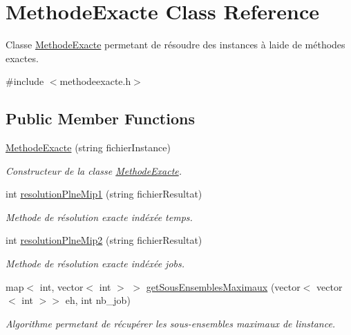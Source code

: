 \hypertarget{classMethodeExacte}{}\section{Methode\+Exacte Class Reference}
\label{classMethodeExacte}


Classe \hyperlink{classMethodeExacte}{Methode\+Exacte} permetant de résoudre des instances à l\textquotesingle{}aide de méthodes exactes.  




{\ttfamily \#include $<$methodeexacte.\+h$>$}

\subsection*{Public Member Functions}
\begin{DoxyCompactItemize}
\item 
\hyperlink{classMethodeExacte_a1548457daee37a44a3913378d90dab65}{Methode\+Exacte} (string fichier\+Instance)
\begin{DoxyCompactList}\small\item\em Constructeur de la classe \hyperlink{classMethodeExacte}{Methode\+Exacte}. \end{DoxyCompactList}\item 
int \hyperlink{classMethodeExacte_a202241adc56888d12cf6769a6cab5412}{resolution\+Plne\+Mip1} (string fichier\+Resultat)
\begin{DoxyCompactList}\small\item\em Methode de résolution exacte indéxée temps. \end{DoxyCompactList}\item 
int \hyperlink{classMethodeExacte_ae3a50fe055b468baa284287ba61ba381}{resolution\+Plne\+Mip2} (string fichier\+Resultat)
\begin{DoxyCompactList}\small\item\em Methode de résolution exacte indéxée jobs. \end{DoxyCompactList}\item 
map$<$ int, vector$<$ int $>$ $>$ \hyperlink{classMethodeExacte_a10f398a3e3c163f7fc9b45f48f916f98}{get\+Sous\+Ensembles\+Maximaux} (vector$<$ vector$<$ int $>$$>$ eh, int nb\+\_\+job)
\begin{DoxyCompactList}\small\item\em Algorithme permetant de récupérer les sous-\/ensembles maximaux de l\textquotesingle{}instance. \end{DoxyCompactList}\end{DoxyCompactItemize}


